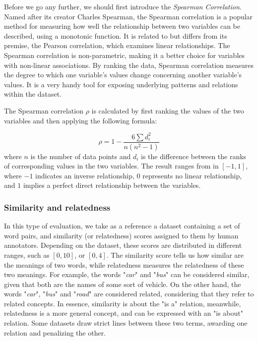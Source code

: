 Before we go any further, we should first introduce the \textit{Spearman Correlation}. Named after its creator Charles Spearman, the Spearman correlation is a popular method for measuring how well the relationship between two variables can be described, using a monotonic function. It is related to but differs from its premise, the Pearson correlation, which examines linear relationships. The Spearman correlation is non-parametric, making it a better choice for variables with non-linear associations. By ranking the data, Spearman correlation measures the degree to which one variable's values change concerning another variable's values. It is a very handy tool for exposing underlying patterns and relations within the dataset. 

The Spearman correlation $\rho$ is calculated by first ranking the values of the two variables and then applying the following formula:

\[
\rho = 1 - \frac{6\sum d_i^2}{n(n^2 - 1)}
\]
\noindent
where $n$ is the number of data points and $d_i$ is the difference between the ranks of corresponding values in the two variables. The result ranges from in $[-1, 1]$, where $-1$ indicates an inverse relationship, $0$ represents no linear relationship, and $1$ implies a perfect direct relationship between the variables.

\subsubsection{Similarity and relatedness}

In this type of evaluation, we take as a reference a dataset containing a set of word pairs, and similarity (or relatedness) scores assigned to them by human annotators. Depending on the dataset, these scores are distributed in different ranges, such as $[0, 10]$, or $[0, 4]$. The similarity score tells us how similar are the meanings of two words, while relatedness measures the relatedness of these two meanings. For example, the words "\textit{car}" and "\textit{bus}" can be considered similar, given that both are the names of some sort of vehicle. On the other hand, the words "\textit{car}", "\textit{bus}" and "\textit{road}" are considered related, considering that they refer to related concepts. In essence, similarity is about the "is a" relation, meanwhile, relatedness is a more general concept, and can be expressed with an "is about" relation. Some datasets draw strict lines between these two terms, awarding one relation and penalizing the other.


